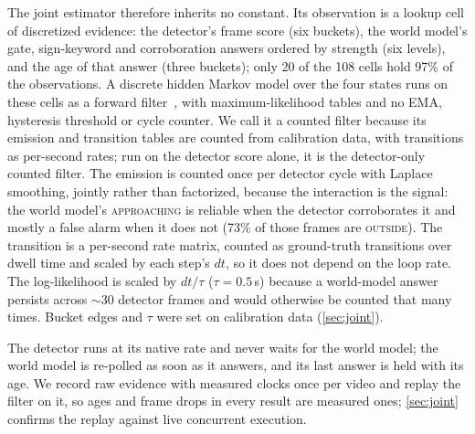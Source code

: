 \documentclass[conference]{IEEEtran}
\let\oldtextsc\textsc
\renewcommand{\textsc}[1]{\mbox{\oldtextsc{#1}}}
\begin{document}
The joint estimator therefore inherits no constant.  Its observation is a lookup cell of discretized evidence: the detector's frame score (six buckets), the world model's gate, sign-keyword and corroboration answers ordered by strength (six levels), and the age of that answer (three buckets); only 20 of the 108 cells hold 97\% of the observations.  A discrete hidden Markov model over the four states runs on these cells as a forward filter~\cite{rabiner1989hmm}, with maximum-likelihood tables and no EMA, hysteresis threshold or cycle counter.  We call it a counted filter because its emission and transition tables are counted from calibration data, with transitions as per-second rates; run on the detector score alone, it is the detector-only counted filter.  The emission is counted once per detector cycle with Laplace smoothing, jointly rather than factorized, because the interaction is the signal: the world model's \textsc{approaching} is reliable when the detector corroborates it and mostly a false alarm when it does not (73\% of those frames are \textsc{outside}).  The transition is a per-second rate matrix, counted as ground-truth transitions over dwell time and scaled by each step's $dt$, so it does not depend on the loop rate.  The log-likelihood is scaled by $dt/\tau$ ($\tau=0.5$\,s) because a world-model answer persists across $\sim$30 detector frames and would otherwise be counted that many times.  Bucket edges and $\tau$ were set on calibration data (\cref{sec:joint}).

The detector runs at its native rate and never waits for the world model; the world model is re-polled as soon as it answers, and its last answer is held with its age.  We record raw evidence with measured clocks once per video and replay the filter on it, so ages and frame drops in every result are measured ones; \cref{sec:joint} confirms the replay against live concurrent execution.
\end{document}
